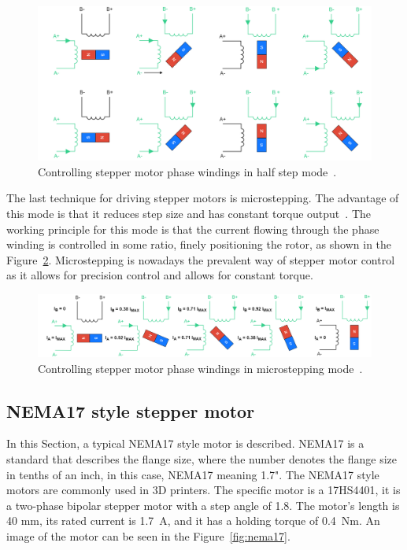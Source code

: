 \begin{figure}[H]
    \centering
    \includegraphics[width=\textwidth]{obrazky/half_step_principle}
    \caption{Controlling stepper motor phase windings in half step mode~\cite{carmine_fiore_stepper_2021}.}
    \label{fig:stepper_half_step_mode}
\end{figure}

The last technique for driving stepper motors is microstepping.
The advantage of this mode is that it reduces step size and has constant torque output~\cite{carmine_fiore_stepper_2021}.
The working principle for this mode is that the current flowing through the phase winding is controlled in some ratio, finely positioning the rotor, as shown in the Figure~\ref{fig:microstepping}.
Microstepping is nowadays the prevalent way of stepper motor control as it allows for precision control and allows for constant torque.

\begin{figure}[H]
    \centering
    \includegraphics[width=\textwidth]{obrazky/microstepping}
    \caption{Controlling stepper motor phase windings in microstepping mode~\cite{carmine_fiore_stepper_2021}.}
    \label{fig:microstepping}
\end{figure}

\subsection{NEMA17 style stepper motor}
\label{subsec:nema}
In this Section, a typical NEMA17 style motor is described.
NEMA17 is a standard that describes the flange size, where the number denotes the flange size in tenths of an inch\cite{reprap_nema_nodate}, in this case, NEMA17 meaning 1.7".
The NEMA17 style motors are commonly used in 3D printers.
The specific motor is a 17HS4401, it is a two-phase bipolar stepper motor with a step angle of 1.8\textdegree.
The motor's length is 40 mm, its rated current is 1.7~A, and it has a holding torque of 0.4~Nm\cite{noauthor_nema_nodate}.
An image of the motor can be seen in the Figure~\ref{fig:nema17}.

